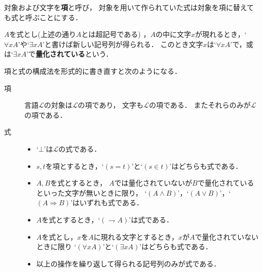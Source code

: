 	
	対象および文字を{\bf 項}と呼び，
	対象を用いて作られていた式は対象を項に替えても式と呼ぶことにする．
	
	$A$を式とし(上述の通り$A$とは超記号である)
	，$A$の中に文字$x$が現れるとき，`$\forall x A$'や`$\exists x A$'と書けば新しい記号列が得られる．
	このとき文字$x$は`$\forall x A$'で，或は`$\exists x A$'で{\bf 量化されている}という．
	
	項と式の構成法を形式的に書き直すと次のようになる．
	\begin{description}
		\item[項] 言語$\mathcal{L}$の対象は$\mathcal{L}$の項であり，
			文字も$\mathcal{L}$の項である．
			またそれらのみが$\mathcal{L}$の項である．
			
		\item[式] 
			\begin{itemize}
				\item `$\bot$'は$\mathcal{L}$の式である．
				
				\item $s,t$を項とするとき，`$(s=t)$'と`$(s \in t)$'はどちらも式である．
					
				\item $A,B$を式とするとき，
					$A$では量化されていないが$B$で量化されているといった文字が無いときに限り，
					`$(A \wedge B)$'，`$(A \vee B)$'，`$(A \Longrightarrow B)$'はいずれも式である．
				
				\item $A$を式とするとき，`$(\rightharpoondown A)$'は式である．
				
				\item $A$を式とし，$x$を$A$に現れる文字とするとき，$x$が$A$で量化されていないときに限り
					`$(\forall x A)$'と`$(\exists x A)$'はどちらも式である．
				
				\item 以上の操作を繰り返して得られる記号列のみが式である．
			\end{itemize}
	\end{description}
	
